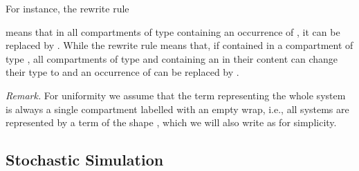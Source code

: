 \begin{comment}
A \emph{rewrite rule} is a pair , denoted by , where  is a pattern and   is a compartment of the same type of  such that the variables occurring in it are a subset of the variables occurring in .
The application of a rule  to a term
 is performed in the following way: 1) Find (if it exists) a compartment  in  and a substitution  of variables by ground terms
such that ; and 2) Replace in  the subterm  with . We write   if
 is obtained  by applying a rewrite rule to  .

 A rewrite rule  then states that a compartment ,
obtained by instantiating variables in  by some instantiation function , can be transformed into the compartment 
with the same label of . Linearity is not required in the r.h.s. of a rule, thus allowing duplication.

In many cases rules involve only the content of a compartment. We therefore introduce the following notation:

 as a short for
 
where  and  are canonically chosen variables not occurring in  and .


For instance, the rewrite rule
  
means that in all compartments of type  an occurrence of   can be replaced by  (the implicit variable  matches with the whole membrane
and the implicit variable  matches with all the remaining part of the compartment content).
\end{comment}


For instance, the rewrite rule
  
means that in all compartments of type  containing an occurrence of , it can be replaced by . While the rewrite rule   means that, if contained in a compartment of type , all compartments of type  and containing an  in their content can change their type to  and an occurrence of   can be replaced by .


 \noindent \emph{Remark.} For  uniformity we assume that the term representing the whole
system is always a single compartment labelled  with an empty wrap, i.e., all systems are represented by a term of the shape
, which we will also write as  for simplicity.


\subsection{Stochastic Simulation}\label{SECT:STO_SEM}

